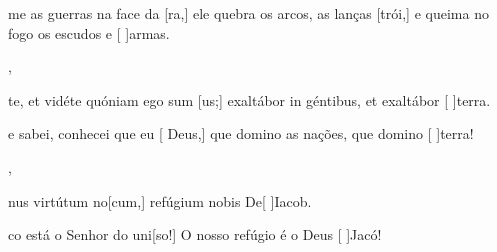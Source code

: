 {    {\item {}me as guerras na face da [ra,] ele quebra os arcos, as lanças [trói,] e queima no fogo os escudos e [ ]{ar}mas.~\Antiphona},
  {\item {}te, et vidéte quóniam ego sum [us;] exaltábor in géntibus, et exaltábor [ ]{ter}ra.~\Antiphona}%
    {\item {} e sabei, conhecei que eu [ Deus,] que domino as nações, que domino [ ]{ter}ra!~\Antiphona},
  {\item {}nus virtútum no[cum,] refúgium nobis De\-[ ]{Ia}cob.~\Antiphona}%
    {\item {}co está o Senhor do uni[so!] O nosso refúgio é o Deus [ ]{Ja}có!~\Antiphona}
}
